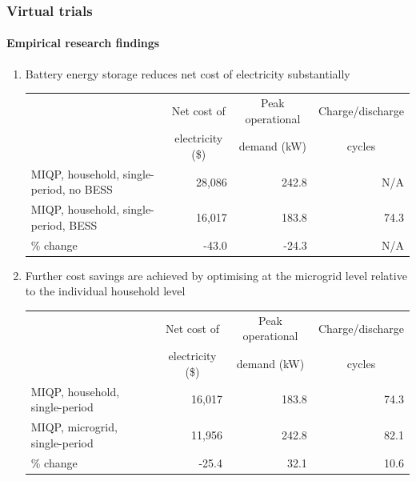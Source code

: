 \documentclass[handout, smaller, xcolor=table]{beamer}			%
\newcounter{enumcount}
\begin{document}
\begin{frame}
	\frametitle{Virtual trials}
	\framesubtitle{Empirical research findings}

	\begin{enumerate}
		\item  Battery energy storage reduces net cost of electricity substantially
			\vspace{-0.5em}
			\begin{table}[!h]
			\centering
			{\scriptsize
			\begin{tabular}{l r r r}
				\toprule
				& \multicolumn{1}{c}{Net cost of}	& \multicolumn{1}{c}{Peak operational}	& \multicolumn{1}{c}{Charge/discharge}	\\
				& \multicolumn{1}{c}{	electricity (\$)} 	& \multicolumn{1}{c}{demand (kW)}		&\multicolumn{1}{c}{cycles}	\\
				\midrule
				MIQP, household, single-period, no BESS	& 28,086	& 242.8	& N/A	\\
				MIQP, household, single-period, BESS	& 16,017	& 183.8	& 74.3	\\
				\midrule
				\% change	& -43.0	& -24.3	& N/A	\\
				\bottomrule
			\end{tabular}
			}
			\end{table}
		
		
		\item  Further cost savings are achieved by optimising at the microgrid level relative to the individual household level
			\vspace{0.5em}
			\begin{table}[!h]
			\centering
			{\scriptsize
			\begin{tabular}{l r r r}
				\toprule
				& \multicolumn{1}{c}{Net cost of}	& \multicolumn{1}{c}{Peak operational}	& \multicolumn{1}{c}{Charge/discharge}	\\
				& \multicolumn{1}{c}{	electricity (\$)} 	& \multicolumn{1}{c}{demand (kW)}		&\multicolumn{1}{c}{cycles}	\\
				\midrule
				MIQP, household, single-period		& 16,017	& 183.8	& 74.3	\\
				MIQP, microgrid, single-period		& 11,956	& 242.8	& 82.1	\\
				\midrule
				\% change	& -25.4	& 32.1	& 10.6	\\
				\bottomrule
			\end{tabular}
			}
			\end{table}
			
		\setcounter{enumcount}{\value{enumi}}
	\end{enumerate}

\end{frame}
\end{document}
